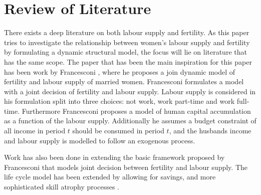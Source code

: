 \section{Review of Literature}\label{sec:lit_review}

There exists a deep literature on both labour supply and fertility.
As this paper tries to investigate the relationship between women's labour supply and fertility by formulating a dynamic  structural model, the focus will lie on literature that has the same scope. The paper that has been the main inspiration for this paper has been work by Francesconi \parencite{francesconi_joint_2002}, where he proposes a join dynamic model of fertility and labour supply of married women. Francesconi formulates a model with a joint decision of fertility and labour supply. Labour supply is considered in his formulation split into three choices: not work, work part-time and work full-time. Furthermore Francesconi proposes a model of human capital accumulation as a function of the labour supply. Additionally he assumes a budget constraint of all income in period $t$ should be consumed in period $t$, and the husbands income and labour supply is modelled to follow an exogenous process. 

Work has also been done in extending the basic framework proposed by Francesconi that models joint decision between fertility and labour supply.  The life cycle model has been extended by allowing for savings, and more sophisticated skill atrophy processes \parencite{adda_career_2011}.
